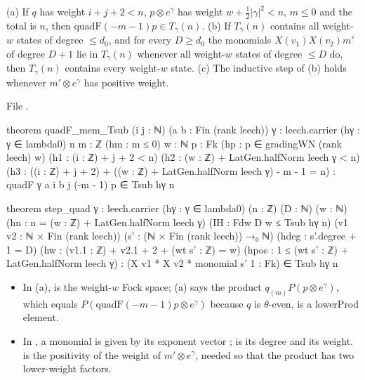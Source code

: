 \begin{lemma}\label{ch12:lem:ascent}
(a) If $q$ has weight $i+j+2<n$, $p\otimes e^\gamma$ has weight $w+\tfrac12|\gamma|^2<n$, $m\le0$ and the total
is $n$, then $\mathrm{quadF}(-m-1)p\in T_\gamma(n)$.
(b) If $T_\gamma(n)$ contains all weight-$w$ states of degree $\le d_0$, and for every $D\ge d_0$ the
monomials $X(v_1)X(v_2)m'$ of degree $D+1$ lie in $T_\gamma(n)$ whenever all weight-$w$ states of
degree $\le D$ do, then $T_\gamma(n)$ contains every weight-$w$ state.
(c) The inductive step of (b) holds whenever $m'\otimes e^\gamma$ has positive weight.
\end{lemma}
File .
\begin{leancode}
theorem quadF_mem_Tsub (i j : ℕ) (a b : Fin (rank leech)) {γ : leech.carrier} (hγ : γ ∈ lambda0)
    {n m : ℤ} (hm : m ≤ 0) {w : ℕ} {p : Fk} (hp : p ∈ gradingWN (rank leech) w)
    (h1 : (i : ℤ) + j + 2 < n) (h2 : (w : ℤ) + LatGen.halfNorm leech γ < n)
    (h3 : ((i : ℤ) + j + 2) + ((w : ℤ) + LatGen.halfNorm leech γ) - m - 1 = n) :
    quadF γ a i b j (-m - 1) p ∈ Tsub hγ n

theorem step_quad {γ : leech.carrier} (hγ : γ ∈ lambda0) (n : ℤ) (D : ℕ) (w : ℕ)
    (hn : n = (w : ℤ) + LatGen.halfNorm leech γ)
    (IH : Fdw D w ≤ Tsub hγ n) (v1 v2 : ℕ × Fin (rank leech)) (s' : (ℕ × Fin (rank leech)) →₀ ℕ)
    (hdeg : s'.degree + 1 = D) (hw : (v1.1 : ℤ) + v2.1 + 2 + (wt s' : ℤ) = w)
    (hpos : 1 ≤ (wt s' : ℤ) + LatGen.halfNorm leech γ) :
    (X v1 * X v2 * monomial s' 1 : Fk) ∈ Tsub hγ n
\end{leancode}
\begin{dictionary}
\begin{itemize}
\item In (a),  is the weight-$w$ Fock space; (a) says the product
  $q_{(m)}P(p\otimes e^\gamma)$, which equals $P(\mathrm{quadF}(-m-1)p\otimes e^\gamma)$ because $q$ is
  $\theta$-even, is a lowerProd element.
\item In , a monomial is given by its exponent vector ;  is its
  degree and  its weight.   is the positivity of the weight of
  $m'\otimes e^\gamma$, needed so that the product has two lower-weight factors.
\end{itemize}
\end{dictionary}


